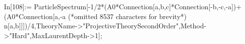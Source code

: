 In[108]:= ParticleSpectrum[-1/2*(A0*Connection[a,b,c]*Connection[-b,-c,-a])+(A0*Connection[a,-a (*omitted 8537 characters for brevity*) n[a,b]]])/4,TheoryName->"ProjectiveTheorySecondOrder",Method->"Hard",MaxLaurentDepth->1];